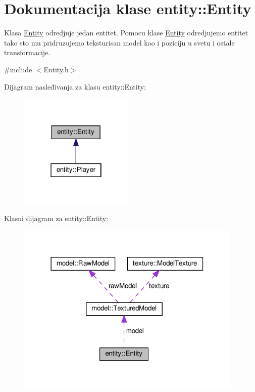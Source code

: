 \hypertarget{classentity_1_1Entity}{}\section{Dokumentacija klase entity\+:\+:Entity}
\label{classentity_1_1Entity}


Klasa \hyperlink{classentity_1_1Entity}{Entity} odredjuje jedan entitet. Pomocu klase \hyperlink{classentity_1_1Entity}{Entity} odredjujemo entitet tako sto mu pridruzujemo teksturisan model kao i poziciju u svetu i ostale transformacije.  




{\ttfamily \#include $<$Entity.\+h$>$}



Dijagram nasleđivanja za klasu entity\+:\+:Entity\+:
\nopagebreak
\begin{figure}[H]
\begin{center}
\leavevmode
\includegraphics[width=154pt]{classentity_1_1Entity__inherit__graph}
\end{center}
\end{figure}


Klasni dijagram za entity\+:\+:Entity\+:
\nopagebreak
\begin{figure}[H]
\begin{center}
\leavevmode
\includegraphics[width=306pt]{classentity_1_1Entity__coll__graph}
\end{center}
\end{figure}
